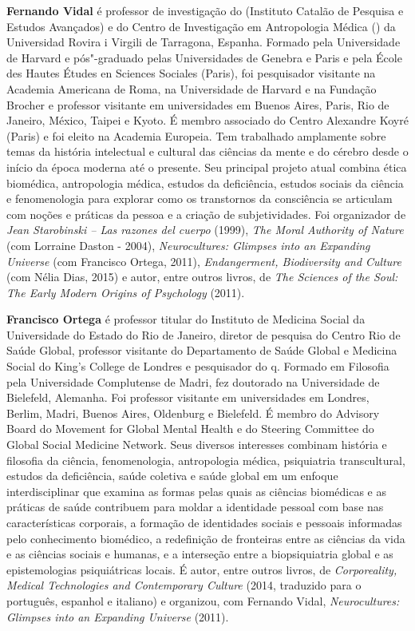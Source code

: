 \textbf{Fernando Vidal} é professor de investigação do  (Instituto
Catalão de Pesquisa e Estudos Avançados) e do Centro de Investigação em
Antropologia Médica () da Universidad Rovira i Virgili de Tarragona,
Espanha. Formado pela Universidade de Harvard e pós"-graduado pelas
Universidades de Genebra e Paris e pela École des Hautes Études en
Sciences Sociales (Paris), foi pesquisador visitante na Academia
Americana de Roma, na Universidade de Harvard e na Fundação Brocher e
professor visitante em universidades em Buenos Aires, Paris, Rio de
Janeiro, México, Taipei e Kyoto. É membro associado do Centro Alexandre
Koyré (Paris) e foi eleito na Academia Europeia. Tem trabalhado
amplamente sobre temas da história intelectual e cultural das ciências
da mente e do cérebro desde o início da época moderna até o presente.
Seu principal projeto atual combina ética biomédica, antropologia
médica, estudos da deficiência, estudos sociais da ciência e
fenomenologia para explorar como os transtornos da consciência se
articulam com noções e práticas da pessoa e a criação de subjetividades.
Foi organizador de \emph{Jean Starobinski -- Las razones del cuerpo}
(1999), \emph{The Moral Authority of Nature} (com Lorraine Daston -
2004), \emph{Neurocultures: Glimpses into an Expanding Universe }(com
Francisco Ortega, 2011), \emph{Endangerment, Biodiversity and
Culture} (com Nélia Dias, 2015) e autor, entre outros livros, de \emph{The
Sciences of the Soul: The Early Modern Origins of Psychology} (2011).

\textbf{Francisco Ortega} é professor titular do Instituto de Medicina
Social da Universidade do Estado do Rio de Janeiro, diretor de pesquisa
do Centro Rio de Saúde Global, professor visitante do Departamento de
Saúde Global e Medicina Social do King's College de Londres e
pesquisador do q. Formado em Filosofia pela Universidade
Complutense de Madri, fez doutorado na Universidade de Bielefeld,
Alemanha. Foi professor visitante em universidades em Londres, Berlim,
Madri, Buenos Aires, Oldenburg e Bielefeld. É membro do Advisory
Board do Movement for Global Mental Health e do Steering Committee do
Global Social Medicine Network. Seus diversos interesses combinam
história e filosofia da ciência, fenomenologia, antropologia médica,
psiquiatria transcultural, estudos da deficiência, saúde coletiva e
saúde global em um enfoque interdisciplinar que examina as formas pelas
quais as ciências biomédicas e as práticas de saúde contribuem para
moldar a identidade pessoal com base nas características corporais, a
formação de identidades sociais e pessoais informadas pelo conhecimento
biomédico, a redefinição de fronteiras entre as ciências da vida e as
ciências sociais e humanas, e a interseção entre a biopsiquiatria global
e as epistemologias psiquiátricas locais. É autor, entre outros livros, de
\emph{Corporeality, Medical Technologies and Contemporary Culture} (2014,
traduzido para o português, espanhol e italiano) e organizou, com
Fernando Vidal, \emph{Neurocultures: Glimpses into an Expanding Universe}
(2011).


